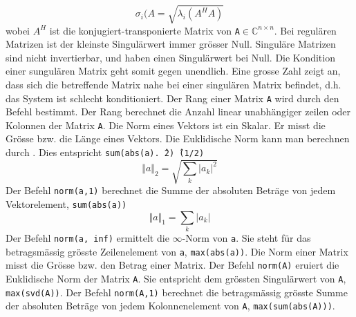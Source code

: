 \begin{equation}
\boxed{\sigma_i(A=\sqrt{\lambda_i(A^HA)}}
\end{equation}
wobei \texttt{$A^H$} ist die konjugiert-transponierte Matrix von \texttt{A$\in\mathbb{C}^{n\times n}$}. Bei regulären Matrizen ist der kleinste Singulärwert immer grösser Null. Singuläre Matrizen sind nicht invertierbar, und haben einen Singulärwert bei Null. Die Kondition einer sungulären Matrix geht somit gegen unendlich. Eine grosse Zahl zeigt an, dass sich die betreffende Matrix nahe bei einer singulären Matrix befindet, d.h. das System ist schlecht konditioniert. 
\newline\newline
Der Rang einer Matrix \texttt{A} wird durch den Befehl  bestimmt. Der Rang berechnet die Anzahl linear unabhängiger zeilen oder Kolonnen der Matrix \texttt{A}. 
\newline\newline
Die Norm eines Vektors ist ein Skalar. Er misst die Grösse bzw. die Länge eines Vektors. Die Euklidische Norm kann man berechnen durch . Dies entspricht \texttt{sum(abs(a).\^\,2)\^\,(1/2)}
\begin{equation}
\boxed{\Big\Vert a\Big\Vert_2=\sqrt{\displaystyle \sum_{k}\Big\vert a_k\Big\vert^2}}
\end{equation}
Der Befehl {\color{red}\texttt{norm(a,1)}} berechnet die Summe der absoluten Beträge von jedem Vektorelement, \texttt{sum(abs(a))}
\begin{equation}
\boxed{\Vert a\Vert_1=\displaystyle \sum_k\Big\vert a_k\Big\vert}
\end{equation}
Der Befehl {\color{red}\texttt{norm(a, inf)}} ermittelt die $\infty$-Norm von \texttt{a}. Sie steht für das betragsmässig grösste Zeilenelement von \texttt{a}, \texttt{max(abs(a))}.
\newline\newline
Die Norm einer Matrix misst die Grösse bzw. den Betrag einer Matrix. Der Befehl {\color{red}\texttt{norm(A)}} eruiert die Euklidische Norm der Matrix \texttt{A}. Sie entspricht dem grössten Singulärwert von \texttt{A}, \texttt{max(svd(A))}.
\newline\newline
Der Befehl {\color{red}\texttt{norm(A,1)}} berechnet die betragsmässig grösste Summe der absoluten Beträge von jedem Kolonnenelement von \texttt{A}, \texttt{max(sum(abs(A)))}.
\newline\newline
